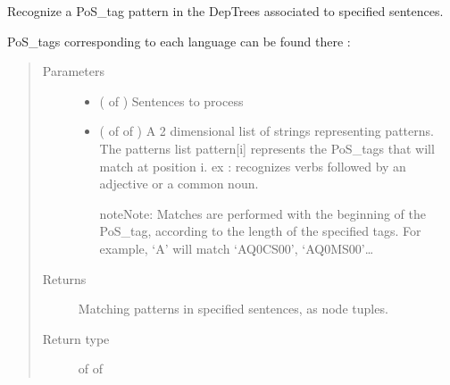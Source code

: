 \documentclass[letterpaper,10pt,english]{sphinxmanual}
\begin{document}

\begin{fulllineitems}
\label{\detokenize{analysis:loacore.analysis.pattern_recognition.pos_tag_patterns_recognition}}
Recognize a PoS\_tag pattern in the DepTrees associated to specified sentences.

PoS\_tags corresponding to each language can be found there :
\begin{quote}\begin{description}
\item[{Parameters}] \leavevmode\begin{itemize}
\item {} 
 ( of {\hyperref[\detokenize{classes:loacore.classes.classes.Sentence}]{}}) \textendash{} Sentences to process

\item {} 
 ( of  of ) \textendash{} 
A 2 dimensional list of strings representing patterns. The patterns list pattern{[}i{]} represents the PoS\_tags that
will match at position i. ex :  recognizes verbs followed by an adjective or a
common noun.

\begin{sphinxadmonition}{note}{Note:}
Matches are performed with the beginning of the PoS\_tag, according to the length of the specified
tags. For example, ‘A’ will match ‘AQ0CS00’, ‘AQ0MS00’…
\end{sphinxadmonition}


\end{itemize}

\item[{Returns}] \leavevmode
Matching patterns in specified sentences, as node tuples.

\item[{Return type}] \leavevmode
{} of  of {\hyperref[\detokenize{classes:loacore.classes.classes.DepTreeNode}]{}}


\end{description}
\end{quote}
\end{fulllineitems}
\end{document}
